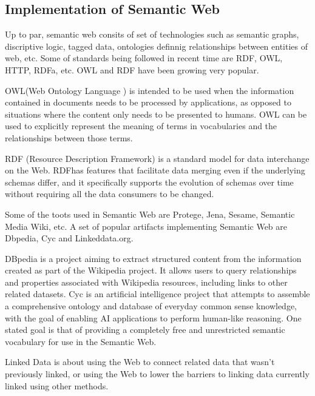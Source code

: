 \documentclass[12pt,a4]{article}
\begin{document}
\subsection{Implementation of Semantic Web}
Up to par, semantic web consits of set of technologies such as semantic graphs, discriptive logic, tagged data, ontologies definnig relationships between entities of web, etc. Some of standards being followed in recent time are RDF, OWL, HTTP, RDFa, etc. OWL and RDF have been growing very popular.


OWL(Web Ontology Language ) is intended to be used when the information contained in documents needs to be processed by applications, as opposed to situations where the content only needs to be presented to humans. OWL can be used to explicitly represent the meaning of terms in vocabularies and the relationships between those terms.

RDF (Resource Description Framework) is a standard model for data interchange on the Web. RDFhas features that facilitate data merging even if the underlying schemas differ, and it specifically supports the evolution of schemas over time without requiring all the data consumers to be
changed. 

Some of the toots used in Semantic Web are Protege, Jena, Sesame, Semantic Media Wiki, etc. A set of popular artifacts implementing Semantic Web are Dbpedia, Cyc and Linkeddata.org.

DBpedia is a project aiming to extract structured content from the information created as part of the Wikipedia project. It allows users to query relationships and properties associated with Wikipedia resources, including links to other related datasets. Cyc is an artificial intelligence project that attempts to assemble a comprehensive ontology and database of everyday common sense knowledge, with the goal of enabling AI applications to perform human-like reasoning. One stated goal is that of providing a completely free and unrestricted semantic vocabulary for use in the Semantic Web.

Linked Data is about using the Web to connect related data that wasn't previously linked, or using the Web to lower the barriers to linking data currently linked using other methods.
\end{document}
